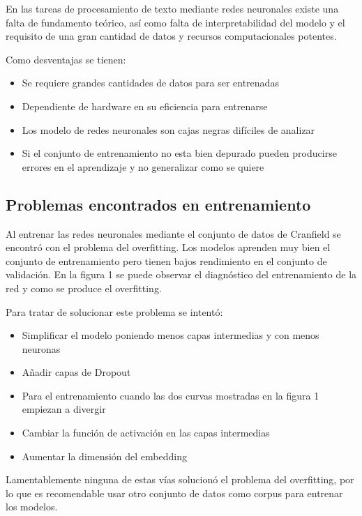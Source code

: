 \documentclass[12pt]{article}
\begin{document}
En las tareas de procesamiento de texto mediante redes neuronales existe una falta de fundamento teórico, as\'i como falta de interpretabilidad del modelo y el requisito de una gran cantidad de datos y recursos computacionales potentes.

Como desventajas se tienen:

\begin{itemize}
	\item Se requiere grandes cantidades de datos para ser entrenadas
	\item Dependiente de hardware en su eficiencia para entrenarse
	\item Los modelo de redes neuronales son cajas negras dif\'iciles de analizar
	\item Si el conjunto de entrenamiento no esta bien depurado pueden producirse errores en el aprendizaje y no generalizar como se quiere
\end{itemize}

\subsection{Problemas encontrados en entrenamiento}

Al entrenar las redes neuronales mediante el conjunto de datos de Cranfield se encontr\'o con el problema del overfitting. Los modelos aprenden muy bien el conjunto de entrenamiento pero tienen bajos rendimiento en el conjunto de validaci\'on. En la figura 1 se puede observar el diagn\'ostico del entrenamiento de la red y como se produce el overfitting.

Para tratar de solucionar este problema se intent\'o:
\begin{itemize}
	\item Simplificar el modelo poniendo menos capas intermedias y con menos neuronas
	\item A\~nadir capas de Dropout
	\item Para el entrenamiento cuando las dos curvas mostradas en la figura 1 empiezan a divergir
	\item Cambiar la funci\'on de activaci\'on en las capas intermedias
	\item Aumentar la dimensi\'on del embedding
\end{itemize}

Lamentablemente ninguna de estas v\'ias solucion\'o el problema del overfitting, por lo que es recomendable usar otro conjunto de datos como corpus para entrenar los modelos.
\end{document}
